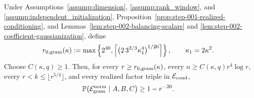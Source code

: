 \begin{proposition}
\label{prop:step-003-normalized-gram-event}
Under Assumptions~\ref{assump:dimension}, \ref{assump:rank_window}, and
\ref{assump:independent_initialization}, Proposition~\ref{prop:step-001-realized-conditioning}, and Lemmas~\ref{lem:step-002-balancing-scalars} and
\ref{lem:step-002-coefficient-gaussianization}, define
\begin{equation}
  r_{0,{\rm gram}}(\kappa)
  :=\max\left\{
    2^{40},
    \left\lceil
      \bigl(2\,3^{2/3}\kappa_1^4\bigr)^{1/20}
    \right\rceil
  \right\},
  \qquad \kappa_1=2\kappa^2.                              \label{eq:step-003-23}
\end{equation}
Choose \(C(\kappa,q)\ge1\). Then, for every
\(r\ge r_{0,{\rm gram}}(\kappa)\), every
\(n\ge C(\kappa,q)r^4\log r\), every
\(r<k\le\lfloor r^{5/4}\rfloor\), and every realized factor triple in
\(\mathcal E_{\rm cond}\),
\begin{equation}
  \mathbb P\!\left(
    \mathcal E_{\rm gram}^{\rm norm}
    \mid A,B,C
  \right)\ge1-r^{-20}.                                     \label{eq:step-003-24}
\end{equation}

\end{proposition}

